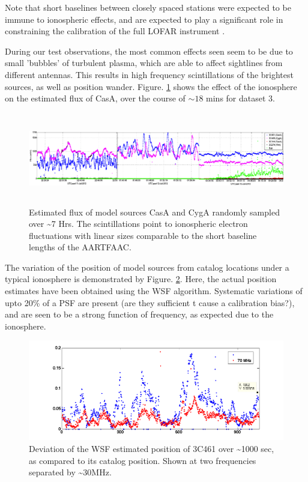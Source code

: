\documentclass{aa}
\begin{document}
Note that short baselines between closely spaced stations were expected
to be immune to ionospheric effects, and are expected to play a significant
role in constraining the calibration of the full LOFAR instrument
\citep{vdTol2007selfcallofar}. 

During our test observations, the most common effects seen seem to
be due to small 'bubbles' of turbulent plasma, which are able to affect
sightlines from different antennas. This results in high frequency
scintillations of the brightest sources, as well as position wander.
Figure. \ref{fig:Estimated-flux-of} shows the effect of the ionosphere
on the estimated flux of CasA, over the course of $\sim18$ mins for
dataset 3.

\begin{figure}[tbh]
\includegraphics[width=1\textwidth,height=4cm]{Figs/combined_plot_utc_tstamp}

\caption{\label{fig:Estimated-flux-of}Estimated flux of model sources CasA
and CygA randomly sampled over \textasciitilde{}7 Hrs. The scintillations
point to ionospheric electron fluctuations with linear sizes comparable
to the short baseline lengths of the AARTFAAC.}
\end{figure}


The variation of the position of model sources from catalog locations
under a typical ionosphere is demonstrated by Figure. \ref{fig:Deviation-of-the}.
Here, the actual position estimates have been obtained using the WSF
algorithm. Systematic variations of upto 20\% of a PSF are present
(are they sufficient t cause a calibration bias?), and are seen to
be a strong function of frequency, as expected due to the ionosphere.

\begin{figure}[tbh]
\includegraphics[width=1.1\columnwidth]{Figs/nighttime_SB0_wsf_deviation_to_SB4_try}

\caption{\label{fig:Deviation-of-the}Deviation of the WSF estimated position
of 3C461 over \textasciitilde{}1000 sec, as compared to its catalog
position. Shown at two frequencies separated by \textasciitilde{}30MHz.}
\end{figure}
\end{document}
